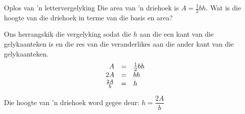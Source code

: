 
\begin{wex}
{Oplos van 'n lettervergelyking}
{
Die area van ’n driehoek is $A=\frac{1}{2}bh$. Wat is die hoogte van die driehoek in terme van die basis en area?
}
{
Ons herrangskik die vergelyking sodat die $h$ aan die een kant
van die gelykaanteken is en die res van die veranderlikes aan die
ander kant van die gelykaanteken.
\begin{equation*}
    \begin{array}{cccc}\hfill A& =& \frac{1}{2}bh\hfill & \\
	\hfill 2A& =& bh\hfill & \hfill \\
	\hfill \frac{2A}{b}& =& h\hfill 
    \end{array}
\end{equation*}

Die hoogte van ’n driehoek word gegee deur: $h=\dfrac{2A}{b}$
} 
\end{wex}

